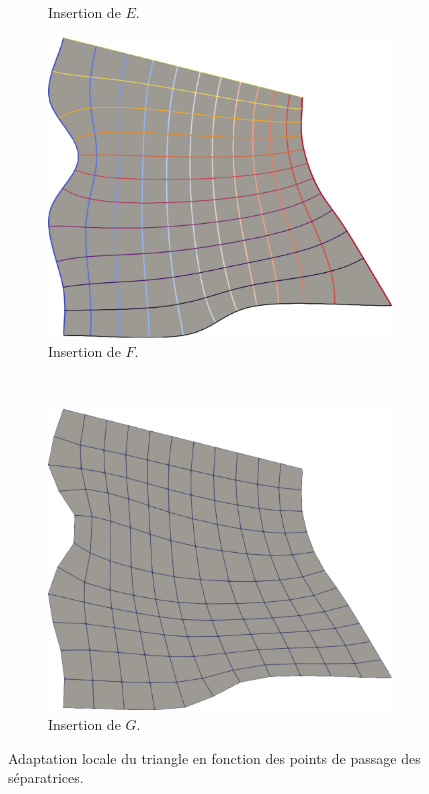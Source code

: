 \begin{figure}[h!]
\begin{subfigure}{0.48\textwidth}
    \caption{Insertion de $E$.}
    \label{fig:quad_equation_2}
\end{subfigure}
\hfill
\begin{subfigure}{0.48\textwidth}
    \includegraphics[width=\textwidth]{images/quad_equation_3.pdf}
    \caption{Insertion de $F$.}
    \label{fig:quad_equation_3}
\end{subfigure}
\\[0.5cm]
\begin{subfigure}{0.48\textwidth}
    \includegraphics[width=\textwidth]{images/quad_equation_4.pdf}
    \caption{Insertion de $G$.}
    \label{fig:quad_equation_4}
\end{subfigure}
\caption{Adaptation locale du triangle en fonction des points de passage des séparatrices.}
\label{fig:quad_equation}
\end{figure}

